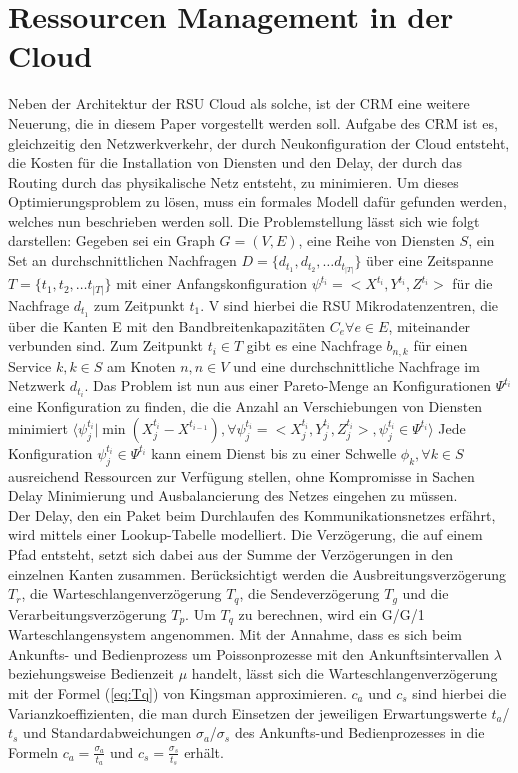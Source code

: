 \documentclass[conference]{IEEEtran}
\begin{document}
\section{Ressourcen Management in der Cloud}

Neben der Architektur der RSU Cloud als solche, ist der CRM eine weitere
Neuerung, die in diesem Paper vorgestellt werden soll.  Aufgabe des CRM ist es, gleichzeitig den Netzwerkverkehr, der durch Neukonfiguration der Cloud entsteht, die Kosten für die Installation von Diensten und den Delay, der durch das Routing durch das physikalische Netz entsteht, zu minimieren.
Um dieses Optimierungsproblem zu lösen, muss ein formales Modell dafür gefunden werden, welches nun beschrieben werden soll. Die Problemstellung lässt sich wie folgt darstellen: Gegeben sei ein Graph \(G=(V,E)\), eine Reihe von Diensten \(S\), ein Set an durchschnittlichen Nachfragen \(D=\{d_{t_1},d_{t_2},…d_{t_{|T|}}\}\) über eine Zeitspanne \(T=\{t_1,t_2,… t_{|T|}\}\) mit einer Anfangskonfiguration \(\psi^{t_i}=<X^{t_i},Y^{t_i},Z^{t_i}>\) für die Nachfrage \(d_{t_1}\)
zum Zeitpunkt \(t_1\). V sind hierbei die RSU Mikrodatenzentren, die über die Kanten E mit
den Bandbreitenkapazitäten \(C_e \forall e \in E\), miteinander verbunden sind. Zum
Zeitpunkt \(t_i \in T\) gibt es eine Nachfrage \(b_{n,k}\) für einen Service \(k, k \in S\) am Knoten \(n, n\in V\) und eine durchschnittliche Nachfrage im Netzwerk \(d_{t_i}\). Das Problem ist nun aus einer Pareto-Menge an Konfigurationen \(\Psi^{t_i}\) eine Konfiguration zu finden, die die Anzahl an Verschiebungen von Diensten minimiert \(\langle \psi_{j}^{t_i}|\min(X_{j}^{t_i}-X^{t_{i-1}}),\forall \psi_{j}^{t_i}=<X_{j}^{t_i},Y_{j}^{t_i},Z_{j}^{t_i}>, \psi_{j}^{t_i} \in \Psi^{t_i}  \rangle\) Jede Konfiguration \(\psi_{j}^{t_i} \in \Psi^{t_i}\) kann einem Dienst bis zu einer Schwelle \(\phi_k, \forall k \in S\) ausreichend Ressourcen zur Verfügung stellen, ohne Kompromisse in Sachen Delay Minimierung und Ausbalancierung des Netzes eingehen zu müssen.\\
Der Delay, den ein Paket beim Durchlaufen des Kommunikationsnetzes erfährt, wird mittels einer Lookup-Tabelle modelliert. Die Verzögerung, die auf einem Pfad entsteht, setzt sich dabei aus der Summe der Verzögerungen in den einzelnen Kanten zusammen. Berücksichtigt werden die Ausbreitungsverzögerung \(T_r\), die Warteschlangenverzögerung \(T_q\), die Sendeverzögerung \(T_g\) und die Verarbeitungsverzögerung \(T_p\). Um \(T_q\) zu berechnen, wird ein G/G/1 Warteschlangensystem angenommen. Mit der Annahme, dass es sich beim Ankunfts- und Bedienprozess um Poissonprozesse mit den Ankunftsintervallen \(\lambda\) beziehungsweise Bedienzeit \(\mu\) handelt, lässt sich die Warteschlangenverzögerung mit der Formel (\ref{eq:Tq}) von Kingsman \cite{IEEEhowto:king} approximieren. \(c_a\) und \(c_s\) sind hierbei die Varianzkoeffizienten, die man durch Einsetzen der jeweiligen Erwartungswerte \(t_a\)/\(t_s\) und Standardabweichungen \(\sigma_a\)/\(\sigma_s\) des Ankunfts-und Bedienprozesses in die Formeln \(c_a=\frac{\sigma_a}{t_a}\) und \(c_s=\frac{\sigma_s}{t_s}\) erhält.
\end{document}
